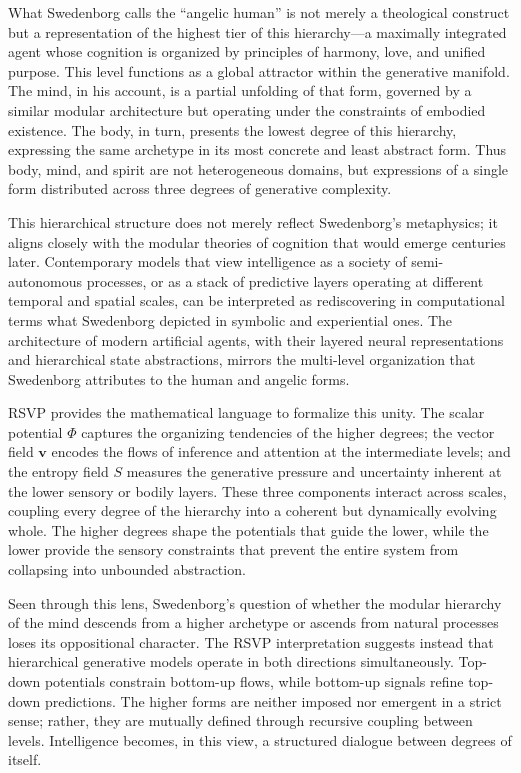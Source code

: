 \documentclass[12pt]{article}
\begin{document}
What Swedenborg calls the “angelic human” is not merely a theological construct 
but a representation of the highest tier of this hierarchy—a maximally 
integrated agent whose cognition is organized by principles of harmony, love, 
and unified purpose. This level functions as a global attractor within the 
generative manifold. The mind, in his account, is a partial unfolding of that 
form, governed by a similar modular architecture but operating under the 
constraints of embodied existence. The body, in turn, presents the lowest 
degree of this hierarchy, expressing the same archetype in its most concrete 
and least abstract form. Thus body, mind, and spirit are not heterogeneous 
domains, but expressions of a single form distributed across three degrees of 
generative complexity.

This hierarchical structure does not merely reflect Swedenborg’s metaphysics; 
it aligns closely with the modular theories of cognition that would emerge 
centuries later. Contemporary models that view intelligence as a society of 
semi-autonomous processes, or as a stack of predictive layers operating at 
different temporal and spatial scales, can be interpreted as rediscovering in 
computational terms what Swedenborg depicted in symbolic and experiential ones.  
The architecture of modern artificial agents, with their layered neural 
representations and hierarchical state abstractions, mirrors the multi-level 
organization that Swedenborg attributes to the human and angelic forms.

RSVP provides the mathematical language to formalize this unity. The scalar 
potential $\Phi$ captures the organizing tendencies of the higher degrees; the 
vector field $\mathbf{v}$ encodes the flows of inference and attention at the 
intermediate levels; and the entropy field $S$ measures the generative 
pressure and uncertainty inherent at the lower sensory or bodily layers. These 
three components interact across scales, coupling every degree of the 
hierarchy into a coherent but dynamically evolving whole. The higher degrees 
shape the potentials that guide the lower, while the lower provide the 
sensory constraints that prevent the entire system from collapsing into 
unbounded abstraction.

Seen through this lens, Swedenborg’s question of whether the modular hierarchy 
of the mind descends from a higher archetype or ascends from natural processes 
loses its oppositional character. The RSVP interpretation suggests instead that 
hierarchical generative models operate in both directions simultaneously. 
Top-down potentials constrain bottom-up flows, while bottom-up signals refine 
top-down predictions. The higher forms are neither imposed nor emergent in a 
strict sense; rather, they are mutually defined through recursive coupling 
between levels. Intelligence becomes, in this view, a structured dialogue 
between degrees of itself.
\end{document}
